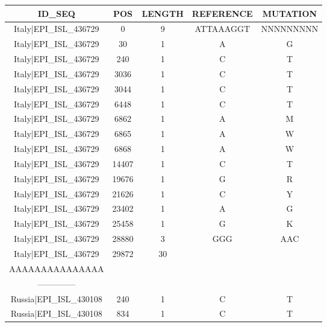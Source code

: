 \documentclass[a4paper,10pt]{article}
\begin{document}
\begin{longtable}{@{}ccccc@{}}
\toprule
\textbf{ID\_SEQ} & \textbf{POS} & \textbf{LENGTH} & \textbf{REFERENCE} & \textbf{MUTATION} \\* \midrule
\endfirsthead
%
\cline{1-5}
\endhead
%
Italy|EPI\_ISL\_436729 & 0 & 9 & ATTAAAGGT & NNNNNNNNN \\* \midrule
Italy|EPI\_ISL\_436729 & 30 & 1 & A & G \\* \midrule
Italy|EPI\_ISL\_436729 & 240 & 1 & C & T \\* \midrule
Italy|EPI\_ISL\_436729 & 3036 & 1 & C & T \\* \midrule
Italy|EPI\_ISL\_436729 & 3044 & 1 & C & T \\* \midrule
Italy|EPI\_ISL\_436729 & 6448 & 1 & C & T \\* \midrule
Italy|EPI\_ISL\_436729 & 6862 & 1 & A & M \\* \midrule
Italy|EPI\_ISL\_436729 & 6865 & 1 & A & W \\* \midrule
Italy|EPI\_ISL\_436729 & 6868 & 1 & A & W \\* \midrule
Italy|EPI\_ISL\_436729 & 14407 & 1 & C & T \\* \midrule
Italy|EPI\_ISL\_436729 & 19676 & 1 & G & R \\* \midrule
Italy|EPI\_ISL\_436729 & 21626 & 1 & C & Y \\* \midrule
Italy|EPI\_ISL\_436729 & 23402 & 1 & A & G \\* \midrule
Italy|EPI\_ISL\_436729 & 25458 & 1 & G & K \\* \midrule
Italy|EPI\_ISL\_436729 & 28880 & 3 & GGG & AAC \\* \midrule
Italy|EPI\_ISL\_436729 & 29872 & 30 & \begin{tabular}[c]{@{}c@{}}AAAAAAAAAAAAAAA\\ AAAAAAAAAAAAAAA\end{tabular} & \begin{tabular}[c]{@{}c@{}}----------------\\ --------------\end{tabular} \\* \midrule
Russia|EPI\_ISL\_430108 & 240 & 1 & C & T \\* \midrule
Russia|EPI\_ISL\_430108 & 834 & 1 & C & T \\* \midrule

\end{longtable}
\end{document}
